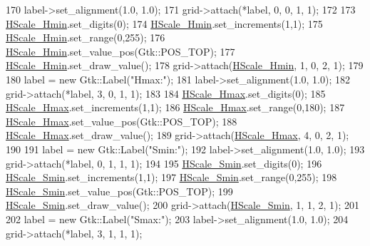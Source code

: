 \begin{DoxyCode}
170     label->set\_alignment(1.0, 1.0);
171     grid->attach(*label, 0, 0, 1, 1);
172 
173     \hyperlink{class_vision_g_u_i_a8cc0de8ce9ca9c05d1c47176b724ecc3}{HScale\_Hmin}.set\_digits(0);
174     \hyperlink{class_vision_g_u_i_a8cc0de8ce9ca9c05d1c47176b724ecc3}{HScale\_Hmin}.set\_increments(1,1);
175     \hyperlink{class_vision_g_u_i_a8cc0de8ce9ca9c05d1c47176b724ecc3}{HScale\_Hmin}.set\_range(0,255);
176     \hyperlink{class_vision_g_u_i_a8cc0de8ce9ca9c05d1c47176b724ecc3}{HScale\_Hmin}.set\_value\_pos(Gtk::POS\_TOP);
177     \hyperlink{class_vision_g_u_i_a8cc0de8ce9ca9c05d1c47176b724ecc3}{HScale\_Hmin}.set\_draw\_value();
178     grid->attach(\hyperlink{class_vision_g_u_i_a8cc0de8ce9ca9c05d1c47176b724ecc3}{HScale\_Hmin}, 1, 0, 2, 1);
179 
180     label = \textcolor{keyword}{new} Gtk::Label(\textcolor{stringliteral}{"Hmax:"});
181     label->set\_alignment(1.0, 1.0);
182     grid->attach(*label, 3, 0, 1, 1);
183 
184     \hyperlink{class_vision_g_u_i_a0b1bb9b8a70bd1f93427f71d0e885313}{HScale\_Hmax}.set\_digits(0);
185     \hyperlink{class_vision_g_u_i_a0b1bb9b8a70bd1f93427f71d0e885313}{HScale\_Hmax}.set\_increments(1,1);
186     \hyperlink{class_vision_g_u_i_a0b1bb9b8a70bd1f93427f71d0e885313}{HScale\_Hmax}.set\_range(0,180);
187     \hyperlink{class_vision_g_u_i_a0b1bb9b8a70bd1f93427f71d0e885313}{HScale\_Hmax}.set\_value\_pos(Gtk::POS\_TOP);
188     \hyperlink{class_vision_g_u_i_a0b1bb9b8a70bd1f93427f71d0e885313}{HScale\_Hmax}.set\_draw\_value();
189     grid->attach(\hyperlink{class_vision_g_u_i_a0b1bb9b8a70bd1f93427f71d0e885313}{HScale\_Hmax}, 4, 0, 2, 1);
190 
191     label = \textcolor{keyword}{new} Gtk::Label(\textcolor{stringliteral}{"Smin:"});
192     label->set\_alignment(1.0, 1.0);
193     grid->attach(*label, 0, 1, 1, 1);
194 
195     \hyperlink{class_vision_g_u_i_a23eb7af1cc6d3a055892de4704b48126}{HScale\_Smin}.set\_digits(0);
196     \hyperlink{class_vision_g_u_i_a23eb7af1cc6d3a055892de4704b48126}{HScale\_Smin}.set\_increments(1,1);
197     \hyperlink{class_vision_g_u_i_a23eb7af1cc6d3a055892de4704b48126}{HScale\_Smin}.set\_range(0,255);
198     \hyperlink{class_vision_g_u_i_a23eb7af1cc6d3a055892de4704b48126}{HScale\_Smin}.set\_value\_pos(Gtk::POS\_TOP);
199     \hyperlink{class_vision_g_u_i_a23eb7af1cc6d3a055892de4704b48126}{HScale\_Smin}.set\_draw\_value();
200     grid->attach(\hyperlink{class_vision_g_u_i_a23eb7af1cc6d3a055892de4704b48126}{HScale\_Smin}, 1, 1, 2, 1);
201 
202     label = \textcolor{keyword}{new} Gtk::Label(\textcolor{stringliteral}{"Smax:"});
203     label->set\_alignment(1.0, 1.0);
204     grid->attach(*label, 3, 1, 1, 1);

\end{DoxyCode}
